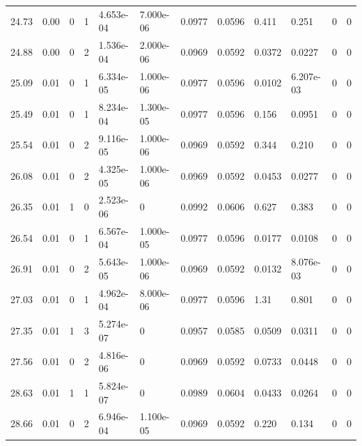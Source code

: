 \documentclass[preview]{standalone}
\begin{document}
{{{\begin{tabular}{L{1.2cm}C{1.2cm} C{0.3cm}C{0.5cm} C{1.4cm}C{1.4cm} C{1.4cm}C{1.4cm} C{1.6cm}C{1.6cm} C{1.6cm}C{1.6cm}}
  24.73  &  0.00  & 0     &  1 &  4.653e-04  & 7.000e-06  &  0.0977&   0.0596& 0.411 & 0.251   &  0 & 0  \\ 
  24.88  &  0.00  & 0     &  2 &  1.536e-04  & 2.000e-06  &  0.0969&   0.0592& 0.0372 & 0.0227   &  0 & 0  \\ 
  25.09  &  0.01  & 0     &  1 &  6.334e-05  & 1.000e-06  &  0.0977&   0.0596& 0.0102 & 6.207e-03   &  0 & 0  \\ 
  25.49  &  0.01  & 0     &  1 &  8.234e-04  & 1.300e-05  &  0.0977&   0.0596& 0.156 & 0.0951   &  0 & 0  \\ 
  25.54  &  0.01  & 0     &  2 &  9.116e-05  & 1.000e-06  &  0.0969&   0.0592& 0.344 & 0.210   &  0 & 0  \\ 
  26.08  &  0.01  & 0     &  2 &  4.325e-05  & 1.000e-06  &  0.0969&   0.0592& 0.0453 & 0.0277   &  0 & 0  \\ 
  26.35  &  0.01  & 1     &  0 &  2.523e-06  & 0  &  0.0992&   0.0606& 0.627 & 0.383   &  0 & 0  \\ 
  26.54  &  0.01  & 0     &  1 &  6.567e-04  & 1.000e-05  &  0.0977&   0.0596& 0.0177 & 0.0108   &  0 & 0  \\ 
  26.91  &  0.01  & 0     &  2 &  5.643e-05  & 1.000e-06  &  0.0969&   0.0592& 0.0132 & 8.076e-03   &  0 & 0  \\ 
  27.03  &  0.01  & 0     &  1 &  4.962e-04  & 8.000e-06  &  0.0977&   0.0596& 1.31 & 0.801   &  0 & 0  \\ 
  27.35  &  0.01  & 1     &  3 &  5.274e-07  & 0  &  0.0957&   0.0585& 0.0509 & 0.0311   &  0 & 0  \\ 
  27.56  &  0.01  & 0     &  2 &  4.816e-06  & 0  &  0.0969&   0.0592& 0.0733 & 0.0448   &  0 & 0  \\ 
  28.63  &  0.01  & 1     &  1 &  5.824e-07  & 0  &  0.0989&   0.0604& 0.0433 & 0.0264   &  0 & 0  \\ 
  28.66  &  0.01  & 0     &  2 &  6.946e-04  & 1.100e-05  &  0.0969&   0.0592& 0.220 & 0.134   &  0 & 0  \\ 
\hline 
\end{tabular} 

}}}
\end{document}
